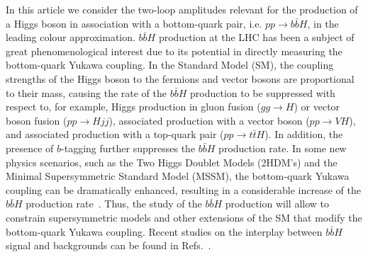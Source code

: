 \documentclass[main.tex]{subfiles}
\begin{document}
In this article we consider the two-loop amplitudes relevant for the production of a Higgs boson in
association with a bottom-quark pair, i.e. $pp \to b\bar{b}H$, in the leading colour approximation.
$b\bar{b}H$ production at the LHC has been a subject of great phenomenological interest due to its
potential in directly measuring the bottom-quark Yukawa coupling. In the Standard Model (SM), the
coupling strengths of the Higgs boson to the fermions and vector bosons are proportional to their
mass, causing the rate of the $b\bar{b}H$ production to be suppressed with respect to, for example,
Higgs production in gluon fusion ($gg\to H$) or vector boson fusion ($pp\to Hjj$), associated
production with a vector boson ($pp\to VH$), and associated production with a top-quark pair ($pp\to
t\bar{t}H$). In addition, the presence of $b$-tagging further suppresses the $b\bar{b}H$ production
rate.  In some new physics scenarios, such as the Two Higgs Doublet Models (2HDM's) and the Minimal
Supersymmetric Standard Model (MSSM), the bottom-quark Yukawa coupling can be dramatically enhanced,
resulting in a considerable increase of the $b\bar{b}H$ production
rate~\cite{Balazs:1998nt,Dawson:2005vi}.  Thus, the study of the $b\bar{b}H$ production will allow
to constrain supersymmetric models and other extensions of the SM that modify the bottom-quark
Yukawa coupling. Recent studies on the interplay between $b\bar{b}H$ signal and backgrounds can be
found in Refs.~\cite{Pagani:2020rsg,Grojean:2020ech,Konar:2021nkk}.
\end{document}
